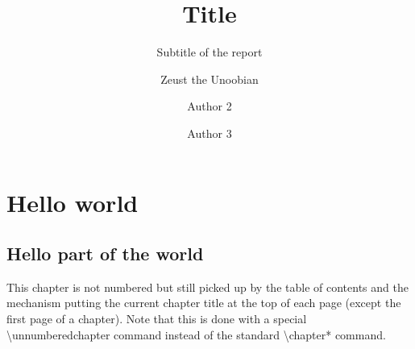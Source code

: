 \documentclass[multiauthor,multisupervisor,todo]{thesis}
\institute{(optional) University of whereveryoulive}
\author{Zeust the Unoobian \and Author 2 \and Author 3}
\title{Title}
\subtitle{Subtitle of the report}
\begin{document}
\maketitle
\tableofcontents

\chapter{Hello world}
\lipsum[1-3]

\section{Hello part of the world}
\lipsum[4-20]

This chapter is not numbered but still picked up by the table of contents and the mechanism putting the current chapter title at the top of each page (except the first page of a chapter).
Note that this is done with a special {\textbackslash}unnumberedchapter command instead of the standard {\textbackslash}chapter* command.

\lipsum[21-30]
\end{document}
